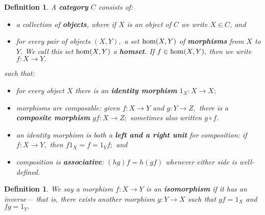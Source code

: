 \documentclass[12pt]{article}
\newtheorem{definition}[thm]{Definition}
\newcommand{\maps}{\colon}
\renewcommand{\hom}{{\rm hom}}
\begin{document}
\begin{definition} A {\bf category} $C$ consists of:
\begin{itemize}
    \item a collection of {\bf objects}, where if $X$ is an object of $C$
    we write $X \in C$, and
    \item for every pair of objects $(X,Y),$ a set $\hom(X,Y)$ of 
    {\bf morphisms} from $X$ to $Y$.  We call this set $\hom(X,Y)$ a
    {\bf homset}.  If $f \in \hom(X,Y),$ then we write $f\maps X\to Y.$
\end{itemize}
such that:
\begin{itemize}
    \item for every object $X$ there is an {\bf identity morphism} $1_X\maps 
     X\to X;$
    \item morphisms are composable: given $f\maps X\to Y$ and $g\maps
    Y\to Z,$ there is a {\bf composite morphism} $gf \maps X \to Z;$
    sometimes also written $g \circ f$.
    \item an identity morphism is both a {\bf left and a right unit} for 
   composition: if $f \maps X\to Y,$ then $f 1_X = f = 1_Y f;$ and
    \item composition is {\bf associative}: $(h g) f = 
   h (g f)$ whenever either side is well-defined.
\end{itemize}
\end{definition}

\begin{definition}
  We say a morphism $f\maps X \to Y$ is an \textbf{isomorphism} if it
  has an inverse--- that is, there exists another morphism $g\maps Y
  \to X$ such that $gf = 1_X$ and $fg = 1_Y.$
\end{definition}
\end{document}
